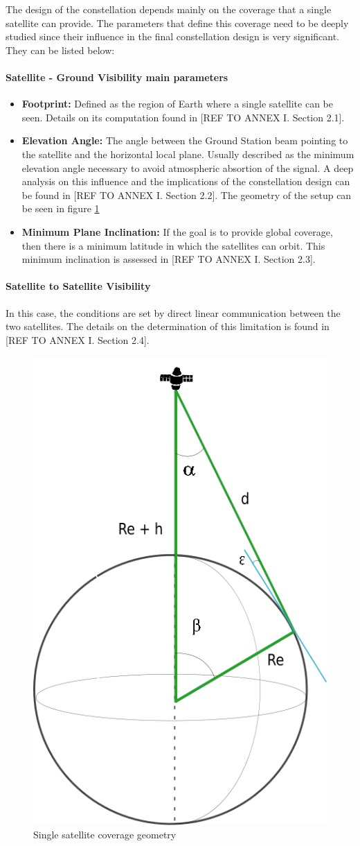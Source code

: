 The design of the constellation depends mainly on the coverage that a single satellite can provide. The parameters that define this coverage need to be deeply studied since their influence in the final constellation design is very significant. They can be listed below:

\paragraph{Satellite - Ground Visibility main parameters}
\begin{itemize}
\item \textbf{Footprint:} Defined as the region of Earth where a single satellite can
be seen. Details on its computation found in [{REF TO ANNEX I. Section 2.1}]. 
\item \textbf{Elevation Angle:} The angle between the Ground Station beam pointing to the satellite and the horizontal local plane. Usually described as the minimum elevation angle necessary to avoid atmospheric absortion of the signal. A deep analysis on this influence and the implications of the constellation design can be found in [{REF TO ANNEX I. Section 2.2}]. The geometry of the setup can be seen in figure \ref{fig:AngleSSatFoot}
\item \textbf{Minimum Plane Inclination: } If the goal is to provide global coverage, then there is a minimum latitude in which the satellites can orbit. This minimum inclination is assessed in [{REF TO ANNEX I. Section 2.3}].
\end{itemize}

\paragraph{Satellite to Satellite Visibility\\}
In this case, the conditions are set by direct linear communication between the two satellites. The details on the determination of this limitation is found in [{REF TO ANNEX I. Section 2.4}].

\begin{figure}[H] %
	\centering
	\includegraphics[width=.3\textwidth]{./fig-Ch2-OrbitalCoverage/AngleSSatFoot.png}
	\caption{Single satellite coverage geometry}
	\label{fig:AngleSSatFoot}
	
\end{figure}